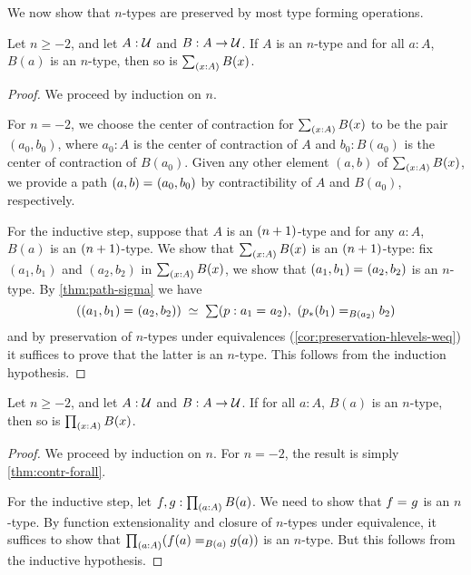 
We now show that $n$-types are preserved by most type forming operations.

\begin{thm}
 Let $n \geq -2$, and let $A : \mathcal{U}$ and $B : A \to \mathcal{U}$.
 If $A$ is an $n$-type and for all $a : A$, $B(a)$ is an $n$-type, then so is $\sm{x : A} B(x)$.
\end{thm}

\begin{proof}
 We proceed by induction on $n$.

 For $n = -2$, we choose the center of contraction for $\sm{x : A} B(x)$ to be the pair
       $(a_0, b_0)$, where $a_0 : A$ is the center of contraction of $A$ and $b_0 : B(a_0)$ is the center of contraction of $B(a_0)$.
       Given any other element $(a,b)$ of $\sm{x : A} B(x)$, we provide a path $(a, b) =_{} (a_0,b_0)$
       by contractibility of $A$ and $B(a_0)$, respectively.

 For the inductive step, suppose that $A$ is an $(n+1)$-type and
         for any $a : A$, $B(a)$ is an $(n+1)$-type. We show that $\sm{x : A} B(x)$ is an $(n+1)$-type:
      fix $(a_1, b_1)$ and $(a_2,b_2)$ in $\sm{x : A} B(x)$,
     we show that $(a_1, b_1) =_{} (a_2,b_2)$ is an $n$-type.
      By \autoref{thm:path-sigma} we have
      \[ \eqvspaced{(\id{(a_1, b_1)}{(a_2,b_2)})}{\sm{p : \id{a_1}{a_2}} (\id[B(a_2)]{\trans{p}{b_1}}{b_2})} \]
   and by preservation of $n$-types under equivalences (\autoref{cor:preservation-hlevels-weq})
   it suffices to prove that the latter is an $n$-type. This follows from the
   induction hypothesis.
\end{proof}


\begin{thm}\label{thm:hlevel-prod}
 Let $n\geq -2$, and let $A : \mathcal{U}$ and $B : A \to \mathcal{U}$.
 If for all $a : A$, $B(a)$ is an $n$-type, then so is $\prd{x : A} B(x)$.
\end{thm}

\begin{proof}
  We proceed by induction on $n$.
  For $n = -2$, the result is simply \autoref{thm:contr-forall}.

  For the inductive step, let $f, g : \prd{a:A}B(a)$.
  We need to show that $f =_{} g$ is an $n$-type.
  By function extensionality and closure of $n$-types under equivalence, it suffices to show that $\prd{a : A} (\id[B(a)]{f(a)}{g(a)})$ is an $n$-type.
  But this follows from the inductive hypothesis.
\end{proof}

